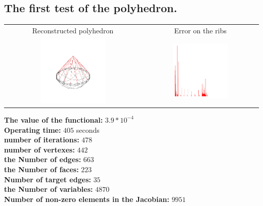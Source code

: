 \documentclass[11pt,fleqn,a4paper]{scrartcl}
\begin{document}
\subsection{The first test of the polyhedron.}
\begin{center}
\begin{tabular}{|c|c|}
\hline
Reconstructed polyhedron & Error on the ribs\\
\includegraphics[width=0.5\textwidth]{bigout1.png} &
\includegraphics[width=0.5\textwidth]{bigerror1.png} \\
\hline
\end{tabular}
\end{center}
\textbf{The value of the functional:} $3.9*10^{-4}$\\
\textbf{Operating time:} $405$ seconds\\
\textbf{number of iterations:} $478$\\
\textbf{number of vertexes:} $442$\\
\textbf{the Number of edges:} $663$\\
\textbf{the Number of faces:} $223$\\
\textbf{Number of target edges:} $35$ \\
\textbf{the Number of variables:} $4870$\\
\textbf{Number of non-zero elements in the Jacobian:} $9951$\\
\newpage
\end{document}
